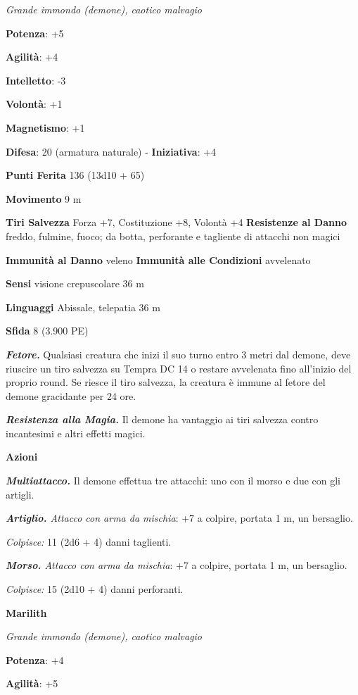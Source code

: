 \begin{multicols}{2}
\emph{Grande immondo (demone), caotico malvagio}

\textbf{Potenza}: +5

\textbf{Agilità}: +4

\textbf{Intelletto}: -3

\textbf{Volontà}: +1

\textbf{Magnetismo}: +1

\textbf{Difesa}: 20 (armatura naturale) - \textbf{Iniziativa}: +4

\textbf{Punti Ferita} 136 (13d10 + 65)

\textbf{Movimento} 9 m

\textbf{Tiri Salvezza} Forza +7, Costituzione +8, Volontà +4
\textbf{Resistenze al Danno} freddo, fulmine, fuoco; da botta,
perforante e tagliente di attacchi non magici

\textbf{Immunità al Danno} veleno \textbf{Immunità alle Condizioni}
avvelenato

\textbf{Sensi} visione crepuscolare 36 m

\textbf{Linguaggi} Abissale, telepatia 36 m 

\textbf{Sfida} 8 (3.900 PE)\smallskip

\emph{\textbf{Fetore.}} Qualsiasi creatura che inizi il suo turno entro
3 metri dal demone, deve riuscire un tiro salvezza su Tempra DC 14
o restare avvelenata fino all'inizio del proprio round. Se riesce il
tiro salvezza, la creatura è immune al fetore del demone gracidante per
24 ore.

\emph{\textbf{Resistenza alla Magia.}} Il demone ha vantaggio ai tiri
salvezza contro incantesimi e altri effetti magici.

\smallskip\textbf{Azioni}

\emph{\textbf{Multiattacco.}} Il demone effettua tre attacchi: uno con
il morso e due con gli artigli.

\emph{\textbf{Artiglio.} Attacco con arma da mischia}: +7 a colpire,
portata 1 m, un bersaglio.

\emph{Colpisce:} 11 (2d6 + 4) danni taglienti.

\emph{\textbf{Morso.} Attacco con arma da mischia}: +7 a colpire,
portata 1 m, un bersaglio.

\emph{Colpisce:} 15 (2d10 + 4) danni perforanti.

\textbf{Marilith}

\emph{Grande immondo (demone), caotico malvagio}

\textbf{Potenza}: +4

\textbf{Agilità}: +5


\end{multicols}
